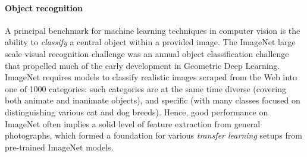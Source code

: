 \paragraph{Object recognition} A principal benchmark for machine learning techniques in computer vision is the ability to \emph{classify} a central object within a provided image. The ImageNet large scale visual recognition challenge \citep[ILSVRC]{russakovsky2015imagenet} was an annual object classification challenge that propelled much of the early development in Geometric Deep Learning. ImageNet requires models to classify realistic images scraped from the Web into one of 1000 categories: such categories are at the same time diverse (covering both animate and inanimate objects), and specific (with many classes focused on distinguishing various cat and dog breeds). Hence, good performance on ImageNet often implies a solid level of feature extraction from general photographs, which formed a foundation for various \emph{transfer learning} setups from pre-trained ImageNet models.


